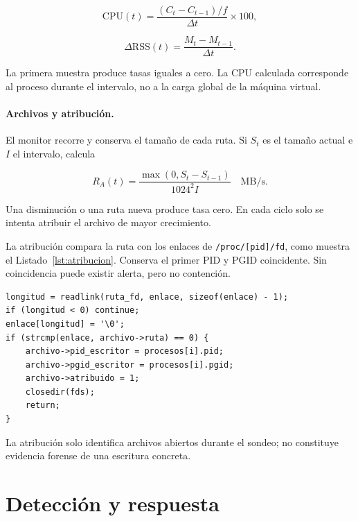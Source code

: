 \begin{equation}
  \mathrm{CPU}(t)=\frac{(C_t-C_{t-1})/f}{\Delta t}\times 100,
\end{equation}

\begin{equation}
  \Delta\mathrm{RSS}(t)=\frac{M_t-M_{t-1}}{\Delta t}.
\end{equation}

La primera muestra produce tasas iguales a cero. La CPU calculada corresponde
al proceso durante el intervalo, no a la carga global de la máquina virtual.

\paragraph{Archivos y atribución.}

El monitor recorre  y conserva el tamaño de cada
ruta. Si $S_t$ es el tamaño actual e $I$ el intervalo, calcula

\begin{equation}
  R_A(t)=\frac{\max(0,S_t-S_{t-1})}{1024^2 I}\quad\mathrm{MB/s}.
\end{equation}

Una disminución o una ruta nueva produce tasa cero. En cada ciclo solo se intenta
atribuir el archivo de mayor crecimiento.

La atribución compara la ruta con los enlaces de \texttt{/proc/[pid]/fd}, como
muestra el Listado~\ref{lst:atribucion}. Conserva el primer PID y PGID
coincidente. Sin coincidencia puede existir alerta, pero no contención.

\begin{lstlisting}[style=codigoC,caption={Comparación usada para atribuir un archivo abierto.},label={lst:atribucion}]
longitud = readlink(ruta_fd, enlace, sizeof(enlace) - 1);
if (longitud < 0) continue;
enlace[longitud] = '\0';
if (strcmp(enlace, archivo->ruta) == 0) {
    archivo->pid_escritor = procesos[i].pid;
    archivo->pgid_escritor = procesos[i].pgid;
    archivo->atribuido = 1;
    closedir(fds);
    return;
}
\end{lstlisting}

La atribución solo identifica archivos abiertos durante el sondeo; no constituye
evidencia forense de una escritura concreta.

\section{Detección y respuesta}
\label{sec:deteccion-respuesta}

